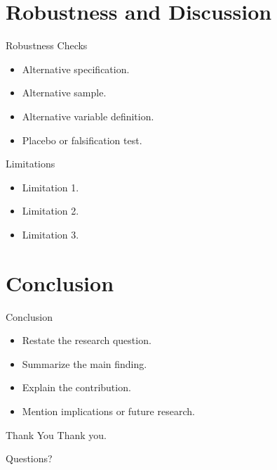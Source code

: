 \documentclass[aspectratio=169]{beamer}
\begin{document}
\section{Robustness and Discussion}

\begin{frame}{Robustness Checks}
  \begin{itemize}
    \item Alternative specification.
    \item Alternative sample.
    \item Alternative variable definition.
    \item Placebo or falsification test.
  \end{itemize}

\end{frame}

\begin{frame}{Limitations}
  \begin{itemize}
    \item Limitation 1.
    \item Limitation 2.
    \item Limitation 3.
  \end{itemize}
\end{frame}

\section{Conclusion}

\begin{frame}{Conclusion}
  \begin{itemize}
    \item Restate the research question.
    \item Summarize the main finding.
    \item Explain the contribution.
    \item Mention implications or future research.
  \end{itemize}
\end{frame}

\begin{frame}{Thank You}
  \centering
  \Large Thank you.

  \vspace{0.8cm}

  \normalsize Questions?
\end{frame}
\end{document}
